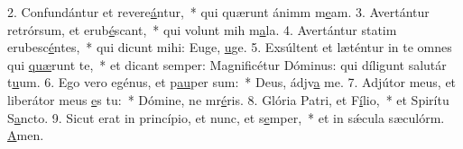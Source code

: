 2. Confundántur et revere\uline{á}ntur,~* qui quærunt ánimm m\uline{e}am.
3. Avertántur retrórsum, et erub\uline{é}scant,~* qui volunt mih m\uline{a}la.
4. Avertántur statim erubesc\uline{é}ntes,~* qui dicunt mihi: Euge, \uline{u}ge.
5. Exsúltent et læténtur in te omnes qui \uline{quæ}runt te,~* et dicant semper: Magnificétur Dóminus: qui díligunt salutár t\uline{u}um.
6. Ego vero egénus, et p\uline{au}per sum:~* Deus, ádjv\uline{a} me.
7. Adjútor meus, et liberátor meus \uline{e}s tu:~* Dómine, ne mr\uline{é}ris.
8. Glória Patri, et F\uline{í}lio,~* et Spirítu S\uline{a}ncto.
9. Sicut erat in princípio, et nunc, et s\uline{e}mper,~* et in sǽcula sæculórm. \uline{A}men.
